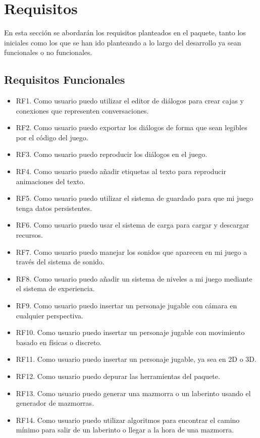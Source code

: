 \section{Requisitos}

En esta sección se abordarán los requisitos planteados en el paquete, tanto los iniciales como los que se han ido planteando a lo largo del desarrollo ya sean funcionales o no funcionales. 

\subsection{Requisitos Funcionales}
\begin{itemize}
    \item RF1. Como usuario puedo utilizar el editor de diálogos para crear cajas y conexiones que representen conversaciones.
    \item RF2. Como usuario puedo exportar los diálogos de forma que sean legibles por el código del juego.
    \item RF3. Como usuario puedo reproducir los diálogos en el juego.
    \item RF4. Como usuario puedo añadir etiquetas al texto para reproducir animaciones del texto.
    \item RF5. Como usuario puedo utilizar el sistema de guardado para que mi juego tenga datos persistentes.
    \item RF6. Como usuario puedo usar el sistema de carga para cargar y descargar recursos.
    \item RF7. Como usuario puedo manejar los sonidos que aparecen en mi juego a través del sistema de sonido.
    \item RF8. Como usuario puedo añadir un sistema de niveles a mi juego mediante el sistema de experiencia.
    \item RF9. Como usuario puedo insertar un personaje jugable con cámara en cualquier perspectiva.
    \item RF10. Como usuario puedo insertar un personaje jugable con movimiento basado en físicas o discreto.
    \item RF11. Como usuario puedo insertar un personaje jugable, ya sea en 2D o 3D.
    \item RF12. Como usuario puedo depurar las herramientas del paquete.
    \item RF13. Como usuario puedo generar una mazmorra o un laberinto usando el generador de mazmorras.
    \item RF14. Como usuario puedo utilizar algoritmos para encontrar el camino mínimo para salir de un laberinto o llegar a la hora de una mazmorra.

\end{itemize}
